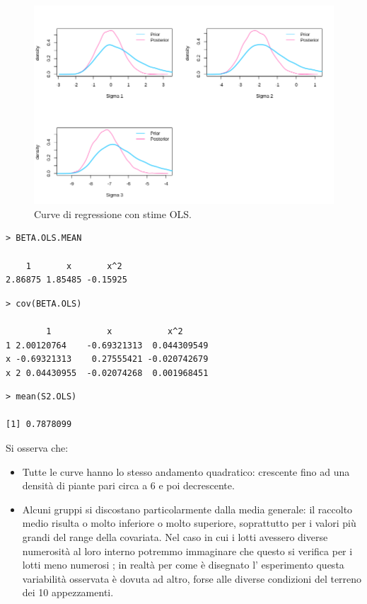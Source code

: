 \begin{figure}
    \centering
    \includegraphics[totalheight=8cm]{img/esercizio11-2-1.png}
    \caption{ Curve di regressione con stime OLS.}
\end{figure}

{
\color{red}
\begin{Verbatim}
> BETA.OLS.MEAN

    1       x       x^2
2.86875 1.85485 -0.15925
\end{Verbatim}
}

{
\color{red}
\begin{Verbatim}
> cov(BETA.OLS)

        1           x           x^2
1 2.00120764    -0.69321313  0.044309549
x -0.69321313    0.27555421 -0.020742679
x 2 0.04430955  -0.02074268  0.001968451
\end{Verbatim}
}

{
\color{red}
\begin{Verbatim}
> mean(S2.OLS)

[1] 0.7878099
\end{Verbatim}
}

Si osserva che:
\begin{itemize}
    \item Tutte le curve hanno lo stesso andamento quadratico: crescente fino ad una densità di piante pari circa a 6 e poi decrescente.
    \item Alcuni gruppi si discostano particolarmente dalla media generale: il raccolto medio risulta o molto inferiore o molto superiore, soprattutto per i valori più grandi del range della covariata. Nel caso in cui i lotti avessero diverse numerosità al loro interno potremmo immaginare che questo si verifica per i lotti meno numerosi ; in realtà per come è disegnato l' esperimento questa variabilità osservata è dovuta ad altro, forse alle diverse condizioni del terreno dei 10 appezzamenti.
\end{itemize}

